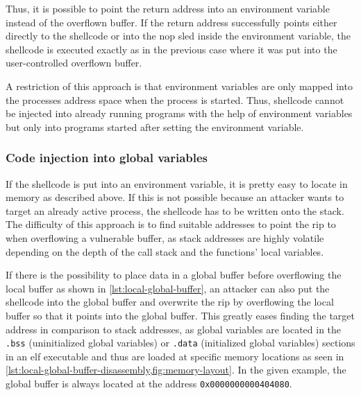 Thus, it is possible to point the return address into an environment variable instead of the overflown buffer.
If the return address successfully points either directly to the shellcode or into the \acrshort{nop} sled inside the environment variable, the shellcode is executed exactly as in the previous case where it was put into the user-controlled overflown buffer.

A restriction of this approach is that environment variables are only mapped into the processes address space when the process is started.
Thus, shellcode cannot be injected into already running programs with the help of environment variables but only into programs started after setting the environment variable.

\subsubsection{Code injection into global variables}
\label{subsubsec:ci-via-globals}

If the shellcode is put into an environment variable, it is pretty easy to locate in memory as described above.
If this is not possible because an attacker wants to target an already active process, the shellcode has to be written onto the stack.
The difficulty of this approach is to find suitable addresses to point the \gls{rip} to when overflowing a vulnerable buffer, as stack addresses are highly volatile depending on the depth of the call stack and the functions' local variables.

If there is the possibility to place data in a global buffer before overflowing the local buffer as shown in \cref{lst:local-global-buffer}, an attacker can also put the shellcode into the global buffer and overwrite the \gls{rip} by overflowing the local buffer so that it points into the global buffer.
This greatly eases finding the target address in comparison to stack addresses, as global variables are located in the \texttt{.bss} (uninitialized global variables) or \texttt{.data} (initialized global variables) sections in an \gls{elf} executable and thus are loaded at specific memory locations as seen in \cref{lst:local-global-buffer-disassembly,fig:memory-layout}.
In the given example, the global buffer is always located at the address \texttt{0x0000000000404080}.



